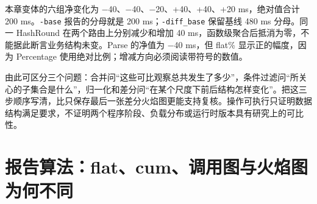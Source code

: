 \documentclass[UTF8,fontset=fandol,openany,11pt]{ctexbook}
\begin{document}
本章变体的六组净变化为 −40、−40、−20、+40、+40、+20 ms，绝对值合计 200 ms。\texttt{-\allowbreak{}base} 报告的分母就是 200 ms；\texttt{-\allowbreak{}diff\_\allowbreak{}base} 保留基线 480 ms 分母。同一 HashRound 在两个路由上分别减少和增加 40 ms，函数级聚合后抵消为零，不能据此断言业务结构未变。Parse 的净值为 −40 ms，但 flat\% 显示正的幅度，因为 Percentage 使用绝对比例；增减方向必须阅读带符号的数值。\cite{pp-total}\cite{pp-percent}\cite{pp-teaching}


由此可区分三个问题：合并问“这些可比观察总共发生了多少”，条件过滤问“所关心的子集合是什么”，归一化和差分问“在某个尺度下前后结构怎样变化”。把这三步顺序写清，比只保存最后一张差分火焰图更能支持复核。操作可执行只证明数据结构满足要求，不证明两个程序阶段、负载分布或运行时版本具有研究上的可比性。\cite{pp-merge}\cite{pp-filter}\cite{pp-diff}


\section{报告算法：flat、cum、调用图与火焰图为何不同}
\end{document}
